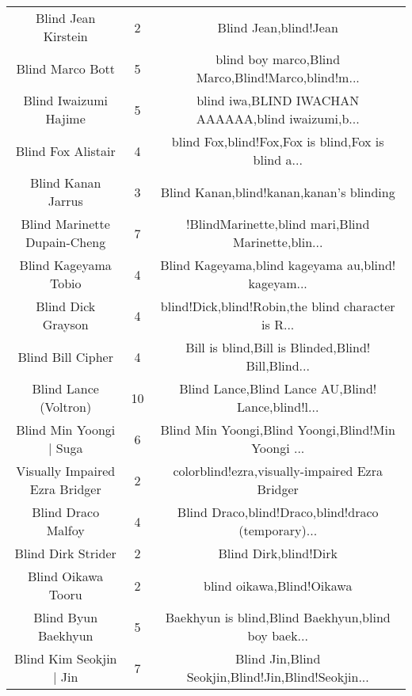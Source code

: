 \begin{table}[h!]
{\begin{tabular}{|c|c|c|}
                               Blind Jean Kirstein &      2 &                              Blind Jean,blind!Jean \\
                                  Blind Marco Bott &      5 & blind boy marco,Blind Marco,Blind!Marco,blind!m... \\
                             Blind Iwaizumi Hajime &      5 & blind iwa,BLIND IWACHAN AAAAAA,blind iwaizumi,b... \\
                                Blind Fox Alistair &      4 & blind Fox,blind!Fox,Fox is blind,Fox is blind a... \\
                                Blind Kanan Jarrus &      3 &           Blind Kanan,blind!kanan,kanan's blinding \\
                      Blind Marinette Dupain-Cheng &      7 & !BlindMarinette,blind mari,Blind Marinette,blin... \\
                              Blind Kageyama Tobio &      4 & Blind Kageyama,blind kageyama au,blind! kageyam... \\
                                Blind Dick Grayson &      4 & blind!Dick,blind!Robin,the blind character is R... \\
                                 Blind Bill Cipher &      4 & Bill is blind,Bill is Blinded,Blind! Bill,Blind... \\
                             Blind Lance (Voltron) &     10 & Blind Lance,Blind Lance AU,Blind! Lance,blind!l... \\
                           Blind Min Yoongi | Suga &      6 & Blind Min Yoongi,Blind Yoongi,Blind!Min Yoongi ... \\
                    Visually Impaired Ezra Bridger &      2 &     colorblind!ezra,visually-impaired Ezra Bridger \\
                                Blind Draco Malfoy &      4 & Blind Draco,blind!Draco,blind!draco (temporary)... \\
                                Blind Dirk Strider &      2 &                              Blind Dirk,blind!Dirk \\
                                Blind Oikawa Tooru &      2 &                          blind oikawa,Blind!Oikawa \\
                               Blind Byun Baekhyun &      5 & Baekhyun is blind,Blind Baekhyun,blind boy baek... \\
                           Blind Kim Seokjin | Jin &      7 & Blind Jin,Blind Seokjin,Blind!Jin,Blind!Seokjin... \\

\end{tabular}}
\end{table}
